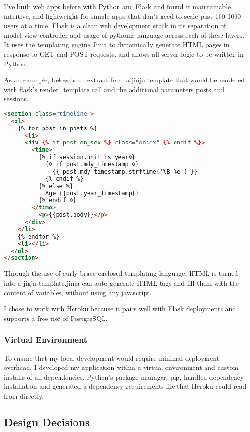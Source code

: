 \documentclass[12pt] {article}
\begin{document}
I've built web apps before with Python and Flask and found it maintainable, intuitive, and lightweight for simple apps that don't need to scale past 100-1000 users at a time. Flask is a clean web development stack in its separation of model-view-controller and usage of pythonic language across each of these layers. It uses the templating engine Jinja to dynamically generate HTML pages in response to GET and POST requests, and allows all server logic to be written in Python.

As an example, below is an extract from a jinja template that would be rendered with flask's render\_template call and the additional parameters posts and sessions.

\begin{lstlisting}[language=HTML, basicstyle=\small]
<section class="timeline">
  <ol>
    {% for post in posts %}
      <li>
      <div {% if post.on_sex %} class="onsex" {% endif %}>
        <time>
          {% if session.unit_is_year%}
            {% if post.mdy_timestamp %}
              {{ post.mdy_timestamp.strftime('%B %e') }}
            {% endif %}
          {% else %}
            Age {{post.year_timestamp}}
          {% endif %}
        </time>
          <p>{{post.body}}</p>
      </div>
    </li>
    {% endfor %}
    <li></li>        
  </ol>
</section>
\end{lstlisting}

Through the use of curly-brace-enclosed templating language, HTML is turned into a jinja template.jinja can auto-generate HTML tags and fill them with the content of variables, without using any javascript.

I chose to work with Heroku because it pairs well with Flask deployments and supports a free tier of PostgreSQL. 

\subsubsection{Virtual Environment}

To ensure that my local development would require minimal deployment overhead, I developed my application within a virtual environment and custom installs of all dependencies. Python's package manager, pip, handled dependency installation and generated a dependency requirements file that Heroku could read from directly. 

\subsection{Design Decisions}
\end{document}
